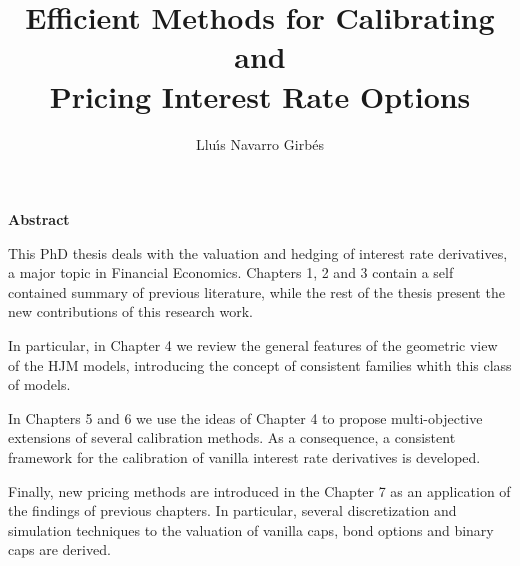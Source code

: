 \documentclass[11pt,a4paper]{article}
\begin{document}
\thispagestyle{empty}

\title{\textbf{Efficient Methods for Calibrating and \\Pricing Interest
    Rate Options}}
\author{Llu\'\i s Navarro Girb\'es}
\date{} %
\maketitle\thispagestyle{empty} %
\begin{center}
\textbf{Abstract}
\end{center}
This PhD thesis deals with the valuation and hedging of interest rate
derivatives, a major topic in Financial Economics. Chapters 1, 2 and 3
contain a self contained summary of previous literature, while the
rest of the thesis present the new contributions of this research
work. 

In particular, in Chapter 4 we review the general features of the
geometric view of the HJM models, introducing the concept of
consistent families whith this class of models. 
 
In Chapters 5 and 6 we use the ideas of Chapter 4 to propose
multi-objective extensions of several calibration methods. As a
consequence, a consistent framework for the calibration of vanilla
interest rate derivatives is developed.

Finally, new pricing methods are introduced in the Chapter 7 as an
application of the findings of previous chapters. In particular,
several discretization and simulation techniques to the valuation of
vanilla caps, bond options and binary caps are derived.
\end{document}
